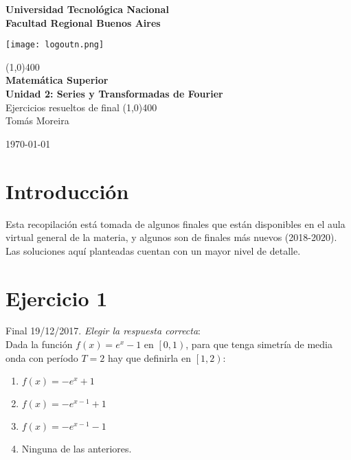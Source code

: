\documentclass[11pt]{article}
\begin{document}
		
	\begin{titlepage}
		\begin{center}
			\vspace*{0.5cm}
			\Large{\textbf{Universidad Tecnológica Nacional}}\\
			\Large{\textbf{Facultad Regional Buenos Aires}}\\
			\begin{center}
				\texttt{[image: logoutn.png]}
			\end{center}
			\vfill
			\line(1,0){400}\\
			\vspace*{0.3cm}
			\huge{\textbf{Matemática Superior}}\\
			\Large{\textbf{Unidad 2: Series y Transformadas de Fourier}}\\
			\large{Ejercicios resueltos de final}
			\line(1,0){400}\\
			\vfill
			Tomás Moreira \\
			
			
			\today
				
				
		\end{center}
	\end{titlepage}

	\tableofcontents
	\thispagestyle{empty}
	\clearpage

	\setcounter{page}{1}
	\section{Introducción}
	Esta recopilación está tomada de algunos finales que están disponibles en el aula virtual general de la materia, y algunos son de finales más nuevos (2018-2020). Las soluciones aquí planteadas cuentan con un mayor nivel de detalle.
	\section{Ejercicio 1}
	Final 19/12/2017. \textit{Elegir la respuesta correcta}:\\
	Dada la función $f(x)=e^{x}-1$ en $\left[0,1\right)$, para que tenga simetría de media onda con período $T=2$ hay que definirla en $\left[1,2\right)$:
	\renewcommand{\labelenumi}{\alph{enumi})}
	\begin{enumerate}
		\item $f(x)=-e^{x}+1$
		\item $f(x)=-e^{x-1}+1$
		\item $f(x)=-e^{x-1}-1$
		\item Ninguna de las anteriores.
	\end{enumerate}
\end{document}
